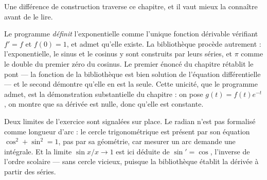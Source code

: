 Une différence de construction traverse ce chapitre, et il vaut mieux la connaître avant de
le lire.

Le programme \emph{définit} l'exponentielle comme l'unique fonction dérivable vérifiant
$f' = f$ et $f(0) = 1$, et admet qu'elle existe. La bibliothèque procède autrement :
l'exponentielle, le sinus et le cosinus y sont construits par leurs séries, et $\pi$ comme le
double du premier zéro du cosinus. Le premier énoncé du chapitre rétablit le pont — la
fonction de la bibliothèque est bien solution de l'équation différentielle — et le second
démontre qu'elle en est la seule. Cette unicité, que le programme admet, est la démonstration
substantielle du chapitre : on pose $g(t) = f(t)e^{-t}$, on montre que sa dérivée est nulle,
donc qu'elle est constante.

Deux limites de l'exercice sont signalées sur place. Le radian n'est pas formalisé comme
longueur d'arc : le cercle trigonométrique est présent par son équation
$\cos^2 + \sin^2 = 1$, pas par sa géométrie, car mesurer un arc demande une intégrale. Et la
limite $\sin x / x \to 1$ est ici déduite de $\sin' = \cos$, l'inverse de l'ordre scolaire —
sans cercle vicieux, puisque la bibliothèque établit la dérivée à partir des séries.
